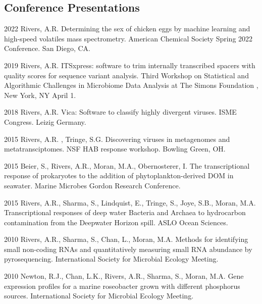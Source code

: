 \documentclass[12pt,letterpaper]{report}
\begin{document}
    \subsection*{Conference Presentations}

    \begin{tablist}

    
\item[2022 ] \tab Rivers, A.R.  Determining the sex of chicken eggs by machine learning and high-speed volatiles mass spectrometry. American Chemical Society Spring 2022 Conference. San Diego, CA.
    	
\item[2019 ] \tab Rivers, A.R. ITSxpress: software to trim internally transcribed spacers with quality scores for sequence variant analysis. Third Workshop on Statistical and Algorithmic Challenges in Microbiome Data Analysis at The Simons Foundation , New York, NY April 1. 

\item[2018 ] \tab Rivers, A.R. Vica: Software to classify highly divergent viruses. ISME Congress. Leizig Germany.

\item[2015 ] \tab Rivers, A.R. , Tringe, S.G. Discovering viruses in metagenomes and metatransciptomes. NSF HAB response workshop. Bowling Green, OH.

\item[2015 ] \tab  Beier, S., Rivers, A.R., Moran, M.A., Obernosterer, I. The transcriptional response of prokaryotes to the addition of phytoplankton-derived DOM in seawater. Marine Microbes Gordon Research Conference. 

\item[2015] \tab Rivers, A.R., Sharma, S., Lindquist, E., Tringe, S., Joye, S.B., Moran, M.A.  Transcriptional responses of deep water Bacteria and Archaea to hydrocarbon contamination from the Deepwater Horizon spill. ASLO Ocean Sciences. 

\item[2010] \tab Rivers, A.R., Sharma, S., Chan, L., Moran, M.A. Methods for identifying small non-coding RNAs and quantitatively measuring small RNA abundance by pyrosequencing. International Society for Microbial Ecology Meeting.

\item[2010] \tab Newton, R.J., Chan, L.K., Rivers, A.R., Sharma, S., Moran, M.A.  Gene expression profiles for a marine roseobacter grown with different phosphorus sources. International Society for Microbial Ecology Meeting.


\end{tablist}
\end{document}
